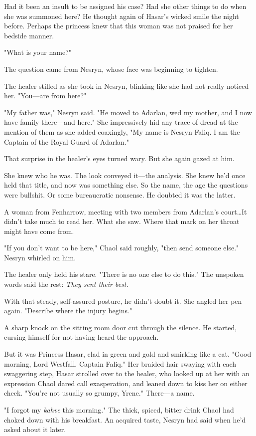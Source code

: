 Had it been an insult to be assigned his case?
Had she other things to do when she was summoned here?
He thought again of Hasar's wicked smile the night before.
Perhaps the princess knew that this woman was not praised for her bedside manner.

"What is your name?"

The question came from Nesryn, whose face was beginning to tighten.

The healer stilled as she took in Nesryn, blinking like she had not really noticed her.
"You---are from here?"

"My father was," Nesryn said.
"He moved to Adarlan, wed my mother, and I now have family there---and here."
She impressively hid any trace of dread at the mention of them as she added coaxingly, "My name is Nesryn Faliq.
I am the Captain of the Royal Guard of Adarlan."

That surprise in the healer's eyes turned wary.
But she again gazed at him.

She knew who he was.
The look conveyed it---the analysis.
She knew he'd once held that title, and now was something else.
So the name, the age the questions were bullshit.
Or some bureaucratic nonsense.
He doubted it was the latter.

A woman from Fenharrow, meeting with two members from Adarlan's court\ldots It didn't take much to read her.
What she saw.
Where that mark on her throat might have come from.

"If you don't want to be here," Chaol said roughly, "then send someone else."
Nesryn whirled on him.

The healer only held his stare.
"There is no one else to do this."
The unspoken words said the rest: \emph{They sent their best.}

With that steady, self-assured posture, he didn't doubt it.
She angled her pen again.
"Describe where the injury begins."

A sharp knock on the sitting room door cut through the silence.
He started, cursing himself for not having heard the approach.

But it was Princess Hasar, clad in green and gold and smirking like a cat.
"Good morning, Lord Westfall.
Captain Faliq."
Her braided hair swaying with each swaggering step, Hasar strolled over to the healer, who looked up at her with an expression Chaol dared call exasperation, and leaned down to kiss her on either cheek.
"You're not usually so grumpy, Yrene."
There---a name.

"I forgot my \emph{kahve} this morning."
The thick, spiced, bitter drink Chaol had choked down with his breakfast.
An acquired taste, Nesryn had said when he'd asked about it later.

